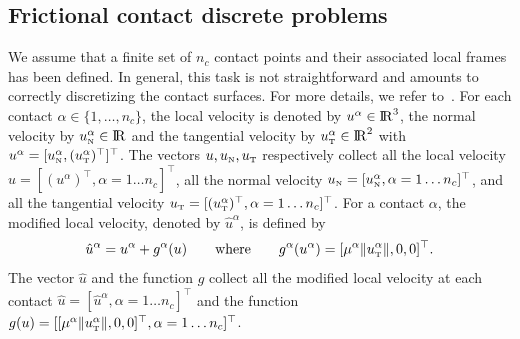 {%



\subsection{Frictional contact discrete problems}


 We assume that a finite set of $n_c$ contact points and their associated local frames has been defined.
 In general, this task is not straightforward and amounts to correctly discretizing  the contact surfaces. For more details, we refer to~\cite{Wriggers2006,Laursen2003}.
%
For each contact $\alpha \in \{1,\ldots, n_c\}$, the local velocity is denoted by $u^\alpha \in \mathrm{I\!R}^3$, the normal velocity by $u_{\hbox{\tiny{N}}}^{\alpha}\in \mathrm{I\!R}$ and the tangential velocity by $u_{\hbox{\tiny{T}}}^\alpha\in\mathrm{I\!R}^2$ with $u^\alpha = [u^\alpha_{{\hbox{\tiny{N}}}}, (u^\alpha_{{\hbox{\tiny{T}}}})^\top]^\top$.
The vectors $u, u_{\hbox{\tiny{N}}}, u_{\hbox{\tiny{T}}}$ respectively collect all the local velocity
$u = [(u^\alpha)^\top, \alpha = 1\ldots n_c]^\top$,
all the normal velocity 
$u_{\hbox{\tiny{N}}} = [ u^\alpha_{{\hbox{\tiny{N}}}}, \alpha = 1\ldots n_c]^\top$,
and all the  tangential velocity
$u_{\hbox{\tiny{T}}} = [(u^\alpha_{{\hbox{\tiny{T}}}})^\top, \alpha = 1\ldots n_c]^\top$.
For a contact $\alpha $, the modified local velocity, denoted by $\hat u^\alpha $, is defined by
\begin{equation}
  \hat u^\alpha = u^\alpha + g^\alpha(u)\qquad\text{where}\qquad
 g^\alpha(u^\alpha) =  [\mu^\alpha  \|u^\alpha_\t\|, 0, 0 ]^\top.
  \label{eq:modified}
\end{equation}
The vector $\hat u$ and the function $g$ collect all the modified local velocity at each contact $\hat u = [\hat u^\alpha, \alpha = 1\ldots n_c]^\top$ and the function $g(u) = [[\mu^\alpha  \|u^\alpha_{\hbox{\tiny{T}}}\|, 0, 0]^\top, \alpha = 1\ldots n_c]^\top$.

}
